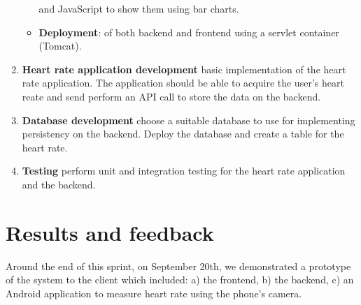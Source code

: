 \begin{enumerate}[1.]
\begin{itemize}
			and JavaScript to show them using bar charts.
		\item \textbf{Deployment}:
			of both backend and frontend using a servlet container (Tomcat).
	\end{itemize}
	\item \textbf{Heart rate application development}\newline
		basic implementation of the heart rate application. The application should be able to acquire
		the user's heart reate and send perform an API call to store the data on the backend.
	\item \textbf{Database development}\newline
		choose a suitable database to use for implementing persistency on the backend.
		Deploy the database and create a table for the heart rate.
	\item \textbf{Testing}\newline
		perform unit and integration testing for the heart rate application and the backend.
\end{enumerate}

\section{Results and feedback}

Around the end of this sprint, on September 20th, we demonstrated a prototype of the system to
the client which included: a) the frontend, b) the backend, c) an Android application to measure
heart rate using the phone's camera.

